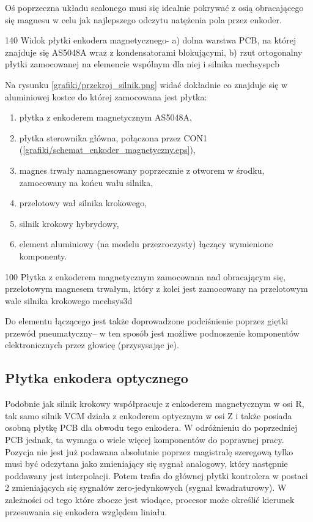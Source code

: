 Oś poprzeczna układu scalonego musi się idealnie pokrywać z osią obracającego się magnesu w celu jak najlepszego odczytu natężenia pola przez enkoder.

	{140}
	{Widok płytki enkodera magnetycznego- a) dolna warstwa PCB, na której znajduje się AS5048A wraz z kondensatorami blokującymi, b) rzut ortogonalny płytki zamocowanej na elemencie wspólnym dla niej i silnika}
	{mechsyspcb}
	
Na rysunku \ref{grafiki/przekroj_silnik.png} widać dokładnie co znajduje się w aluminiowej kostce do której zamocowana jest płytka:

\begin{enumerate}
	\item płytka z enkoderem magnetycznym AS5048A,
	\item płytka sterownika główna, połączona przez CON1 (\ref{grafiki/schemat_enkoder_magnetyczny.eps}),
	\item magnes trwały namagnesowany poprzecznie z otworem w środku, zamocowany na końcu wału silnika,
	\item przelotowy wał silnika krokowego,
	\item silnik krokowy hybrydowy,
	\item element aluminiowy (na modelu przezroczysty) łączący wymienione komponenty.
\end{enumerate}
	
	{100}
	{Płytka z enkoderem magnetycznym zamocowana nad obracającym się, przelotowym magnesem trwałym, który z kolei jest zamocowany na przelotowym wale silnika krokowego}
	{mechsys3d}
	
Do elementu łączącego jest także doprowadzone podciśnienie poprzez giętki przewód pneumatyczny-- w ten sposób jest możliwe podnoszenie komponentów elektronicznych przez głowicę (przysysając je).
	
\subsection{Płytka enkodera optycznego}
\label{ss:encopt}

Podobnie jak silnik krokowy współpracuje z enkoderem magnetycznym w osi R, tak samo silnik VCM działa z enkoderem optycznym w osi Z i także posiada osobną płytkę PCB dla obwodu tego enkodera. W odróżnieniu do poprzedniej PCB jednak, ta wymaga o wiele więcej komponentów do poprawnej pracy. Pozycja nie jest już podawana absolutnie poprzez magistralę szeregową tylko musi być odczytana jako zmieniający się sygnał analogowy, który następnie poddawany jest interpolacji. Potem trafia do głównej płytki kontrolera w postaci 2 zmieniających się sygnałów zero-jedynkowych (sygnał kwadraturowy). W zależności od tego które zbocze jest wiodące, procesor może określić kierunek przesuwania się enkodera względem liniału. \\

